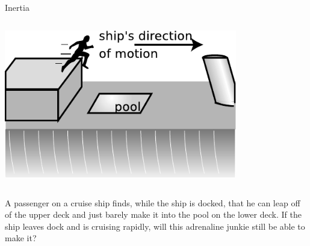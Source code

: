 \begin{frame}{Inertia}
  \begin{mycolumns}

    \begin{column}{.4\textwidth}\includegraphics[width=4in]{ch01/figs/cruise-ship}\end{column}

    \begin{column}{.6\textwidth}
      \dq

      A passenger on a cruise ship finds, while the ship is docked, that
      he can leap off of the upper deck and just barely make it into the pool
      on the lower deck. If the ship leaves dock and is cruising rapidly, will this
      adrenaline junkie still be able to make it?
    \end{column}
  \end{mycolumns}
\end{frame}
